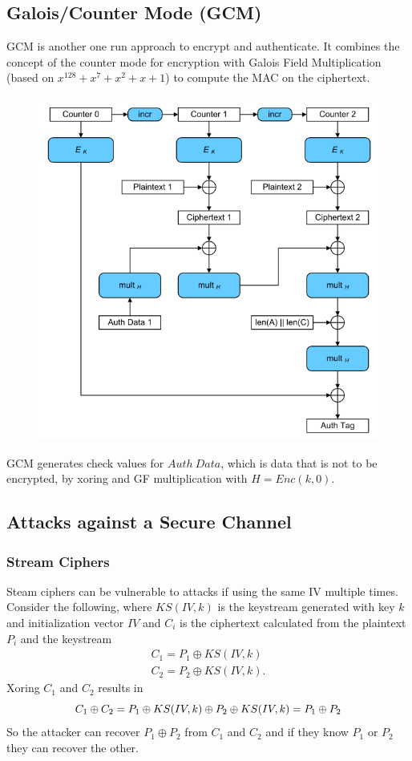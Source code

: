 \subsection{Galois/Counter Mode (GCM)}
GCM is another one run approach to encrypt and authenticate.
It combines the concept of the counter mode for encryption with Galois Field Multiplication (based on $x^{128} + x^7 + x^2 + x + 1$) to compute the MAC on the ciphertext.
\begin{figure}[H]
  \centering
  \includegraphics[width=.7\textwidth]{figures/gcm.png}
\end{figure}
GCM generates check values for $Auth~Data$, which is data that is not to be encrypted, by xoring and GF multiplication with $H = Enc(k,0)$.

\subsection{Attacks against a Secure Channel}
\subsubsection{Stream Ciphers}
Steam ciphers can be vulnerable to attacks if using the same IV multiple times.
Consider the following, where $KS(IV,k)$ is the keystream generated with key $k$ and initialization vector $IV$ and $C_i$ is the ciphertext calculated from the plaintext $P_i$ and the keystream
\begin{equation*}
  \begin{aligned}
    C_1 = P_1 \oplus KS(IV,k)\\
    C_2 = P_2 \oplus KS(IV,k).
  \end{aligned}
\end{equation*}
Xoring $C_1$ and $C_2$ results in
\begin{equation*}
  C_1 \oplus C_2 = P_1 \oplus KS(IV,k) \oplus P_2 \oplus KS(IV,k) = P_1 \oplus P_2\\
\end{equation*}
So the attacker can recover $P_1 \oplus P_2$ from $C_1$ and $C_2$ and if they know $P_1$ or $P_2$ they can recover the other.

